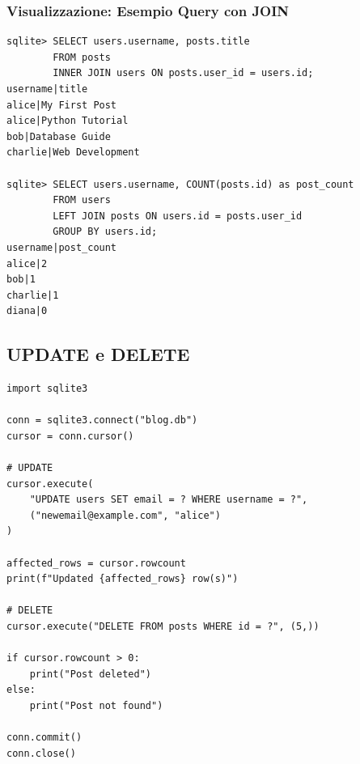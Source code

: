 \begin{center}
\end{center}

\subsubsection{Visualizzazione: Esempio Query con JOIN}

\begin{tcolorbox}[colback=black!5, colframe=black!75, title=Query SELECT con JOIN e risultati, fonttitle=\bfseries\ttfamily]
\begin{verbatim}
sqlite> SELECT users.username, posts.title
        FROM posts
        INNER JOIN users ON posts.user_id = users.id;
username|title
alice|My First Post
alice|Python Tutorial
bob|Database Guide
charlie|Web Development

sqlite> SELECT users.username, COUNT(posts.id) as post_count
        FROM users
        LEFT JOIN posts ON users.id = posts.user_id
        GROUP BY users.id;
username|post_count
alice|2
bob|1
charlie|1
diana|0
\end{verbatim}
\end{tcolorbox}

\subsection{UPDATE e DELETE}

\begin{lstlisting}
import sqlite3

conn = sqlite3.connect("blog.db")
cursor = conn.cursor()

# UPDATE
cursor.execute(
    "UPDATE users SET email = ? WHERE username = ?",
    ("newemail@example.com", "alice")
)

affected_rows = cursor.rowcount
print(f"Updated {affected_rows} row(s)")

# DELETE
cursor.execute("DELETE FROM posts WHERE id = ?", (5,))

if cursor.rowcount > 0:
    print("Post deleted")
else:
    print("Post not found")

conn.commit()
conn.close()
\end{lstlisting}

